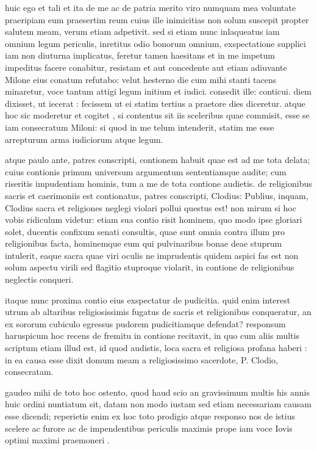  huic ego et tali et ita de me ac de patria merito viro numquam mea voluntate praeripiam eum praesertim reum cuius ille inimicitias non solum suscepit propter salutem meam, verum etiam adpetivit. sed si etiam nunc inlaqueatus iam omnium legum periculis, inretitus odio bonorum omnium, exspectatione supplici iam non diuturna implicatus, feretur tamen haesitans et in me impetum impeditus facere conabitur, resistam et aut concedente aut etiam adiuvante Milone eius conatum refutabo: velut hesterno die cum mihi stanti tacens minaretur, voce tantum attigi legum initium et iudici. consedit ille: conticui. diem dixisset, ut iecerat : fecissem ut ei statim tertius a praetore dies diceretur. atque hoc sic moderetur et cogitet , si contentus sit iis sceleribus quae commisit, esse se iam consecratum Miloni: si quod in me telum intenderit, statim me esse arrepturum arma iudiciorum atque legum.

 atque paulo ante, patres conscripti, contionem habuit quae est ad me tota delata; cuius contionis primum universum argumentum sententiamque audite; cum riseritis impudentiam hominis, tum a me de tota contione audietis. de religionibus sacris et caerimoniis est contionatus, patres conscripti, Clodius: Publius, inquam, Clodius sacra et religiones neglegi violari pollui questus est! non mirum si hoc vobis ridiculum videtur: etiam sua contio risit hominem, quo modo ipse gloriari solet, ducentis confixum senati consultis, quae sunt omnia contra illum pro religionibus facta, hominemque eum qui pulvinaribus bonae deae stuprum intulerit, eaque sacra quae viri oculis ne imprudentis quidem aspici fas est non solum aspectu virili sed flagitio stuproque violarit, in contione de religionibus neglectis conqueri.

 itaque nunc proxima contio eius exspectatur de pudicitia. quid enim interest utrum ab altaribus religiosissimis fugatus de sacris et religionibus conqueratur, an ex sororum cubiculo egressus pudorem pudicitiamque defendat? responsum haruspicum hoc recens de fremitu in contione recitavit, in quo cum aliis multis scriptum etiam illud est, id quod audistis, loca sacra et religiosa profana haberi : in ea causa esse dixit domum meam a religiosissimo sacerdote, P. Clodio, consecratam.

 gaudeo mihi de toto hoc ostento, quod haud scio an gravissimum multis his annis huic ordini nuntiatum sit, datam non modo iustam sed etiam necessariam causam esse dicendi; reperietis enim ex hoc toto prodigio atque responso nos de istius scelere ac furore ac de impendentibus periculis maximis prope iam voce Iovis optimi maximi praemoneri .

